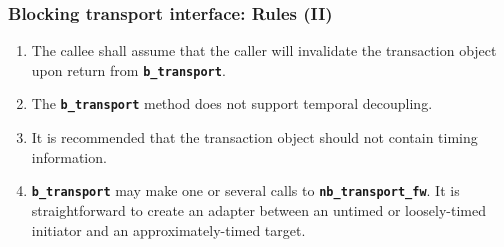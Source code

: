 {\begin{frame}
	\frametitle{Blocking transport interface: Rules (II)}
	\begin{enumerate}
	\item The callee shall assume that the caller will invalidate the transaction object upon return from \texttt{\textbf{b\_transport}}.
	\item The \texttt{\textbf{b\_transport}} method does not support temporal decoupling.
	\item It is recommended that the transaction object should not contain timing information. 
	\item \texttt{\textbf{b\_transport}} may make one or several calls to \texttt{\textbf{nb\_transport\_fw}}. 
	It is straightforward to create an adapter between an untimed or loosely-timed initiator and an approximately-timed target.
	\end{enumerate}
\end{frame}
}

